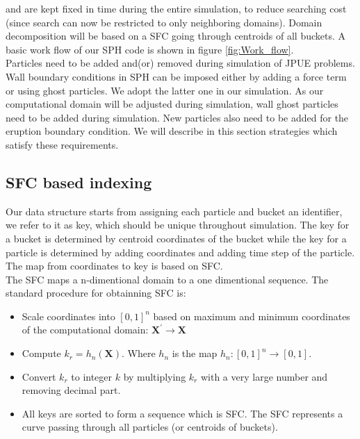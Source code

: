 \documentclass[conference,compsoc]{IEEEtran}
\begin{document}
and are kept fixed in time during the entire simulation, to reduce searching cost (since search can now be restricted to only neighboring domains).
Domain decomposition will be based on a SFC going through centroids of all buckets. A basic work flow of our SPH code is shown in figure \ref{fig:Work_flow}.\\
Particles need to be added and(or) removed during simulation of JPUE problems. Wall boundary conditions in SPH can be imposed either by adding a force term or using ghost particles. We adopt the latter one in our simulation. As our computational domain will be adjusted during simulation, wall ghost particles need to be added during simulation. New particles also need to be added for the eruption boundary condition. 
We will describe in this section strategies which satisfy these requirements.
\subsection{SFC based indexing}
Our data structure starts from assigning each particle and bucket an identifier, we refer to it as key, which should be unique throughout simulation. The key for a bucket is determined by centroid coordinates of the bucket while the key for a particle is determined by adding coordinates and adding time step of the particle. The map from coordinates to key is based on SFC.\\
The SFC \cite{sagan2012space} maps a n-dimentional domain to a one dimentional sequence. The standard procedure for obtainning SFC is: 
\begin{itemize}
\item Scale coordinates into $[0,1]^n $ based on maximum and minimum coordinates of the computational domain: $\textbf{X}^\prime \rightarrow \textbf{X}$
\item Compute $k_r = h_n(\textbf{X})$. Where $h_n$ is the map $h_n: [0,1]^n \rightarrow [0,1]$. 
\item Convert $k_r$ to integer $k$ by multiplying $k_r$ with a very large number and removing decimal part.
\item All keys are sorted to form a sequence which is SFC. The SFC represents a curve passing through all particles (or centroids of buckets).
\end{itemize}
\end{document}
